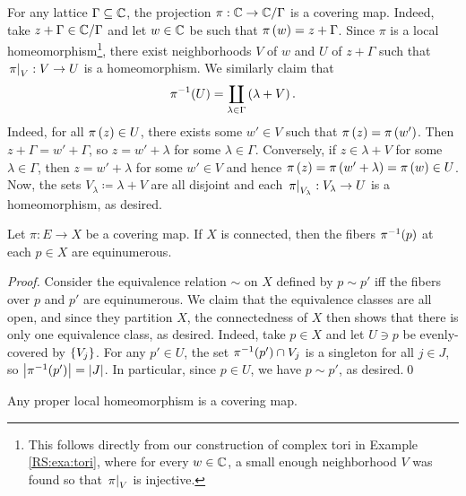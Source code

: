 \documentclass[../Moduli_Spaces_of_Riemann_Surfaces.tex]{subfiles}
\begin{document}
    \begin{example}\label{CS:exa:torus_covering_map}
        For any lattice $\Gamma\subseteq\mathbb{C}$, the projection $\pi:\mathbb{C}\to\mathbb{C}/\Gamma$ is a covering map. Indeed, take $z+\Gamma\in\mathbb{C}/\Gamma$ and let $w\in\mathbb{C}$ be such that $\pi\left(w\right)=z+\Gamma$. Since $\pi$ is a local homeomorphism\footnote{This follows directly from our construction of complex tori in Example \ref{RS:exa:tori}, where for every $w\in\mathbb{C}$, a small enough neighborhood $V$ was found so that $\left.\pi\right|_V$ is injective.}, there exist neighborhoods $V$ of $w$ and $U$ of $z+\Gamma$ such that $\left.\pi\right|_{V}:V\to U$ is a homeomorphism. We similarly claim that
        \begin{equation*}
            \pi^{-1}\!\left(U\right)=\coprod_{\lambda\in\Gamma}\left(\lambda+V\right).
        \end{equation*}
        Indeed, for all $\pi\left(z\right)\in U$, there exists some $w'\in V$ such that $\pi\left(z\right)=\pi\left(w'\right)$. Then $z+\Gamma=w'+\Gamma$, so $z=w'+\lambda$ for some $\lambda\in\Gamma$. Conversely, if $z\in\lambda+V$ for some $\lambda\in\Gamma$, then $z=w'+\lambda$ for some $w'\in V$ and hence $\pi\left(z\right)=\pi\left(w'+\lambda\right)=\pi\left(w\right)\in U$. Now, the sets $V_\lambda\coloneqq\lambda+V$ are all disjoint and each $\left.\pi\right|_{V_\lambda}:V_\lambda\to U$ is a homeomorphism, as desired.\exqed
    \end{example}
    \begin{proposition}\label{CS:prp:fiber_cardinalities_coincide}
        Let $\pi:E\to X$ be a covering map. If $X$ is connected, then the fibers $\pi^{-1}\!\left(p\right)$ at each $p\in X$ are equinumerous.
    \end{proposition}
    \begin{proof}
        Consider the equivalence relation $\sim$ on $X$ defined by $p\sim p'$ iff the fibers over $p$ and $p'$ are equinumerous. We claim that the equivalence classes are all open, and since they partition $X$, the connectedness of $X$ then shows that there is only one equivalence class, as desired. Indeed, take $p\in X$ and let $U\ni p$ be evenly-covered by $\left\{V_j\right\}$. For any $p'\in U$, the set $\pi^{-1}\!\left(p'\right)\cap V_j$ is a singleton for all $j\in J$, so $\left|\pi^{-1}\!\left(p'\right)\right|=\left|J\right|$. In particular, since $p\in U$, we have $p\sim p'$, as desired.\qed
    \end{proof}
    \begin{proposition}\label{CS:prp:proper_local_covering}
        Any proper local homeomorphism is a covering map.
    \end{proposition}
\end{document}
